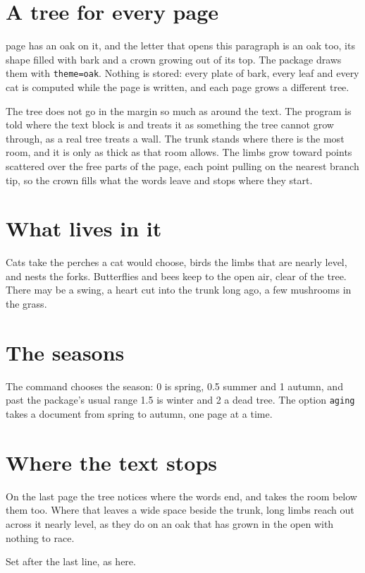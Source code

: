 \documentclass[11pt,a4paper]{article}
\newcommand\code[1]{\texttt{\small #1}}
\begin{document}
\section{A tree for every page}

 page has an oak on it, and the letter that opens this paragraph
is an oak too, its shape filled with bark and a crown growing out of its top. The package draws
them with \code{theme=oak}. Nothing is stored: every plate of bark, every leaf and every cat is
computed while the page is written, and each page grows a different tree.

The tree does not go in the margin so much as around the text. The program is told where the
text block is and treats it as something the tree cannot grow through, as a real tree treats a
wall. The trunk stands where there is the most room, and it is only as thick as that room
allows. The limbs grow toward points scattered over the free parts of the page, each point
pulling on the nearest branch tip, so the crown fills what the words leave and stops where
they start.

\section{What lives in it}

Cats take the perches a cat would choose, birds the limbs that are nearly level, and nests the
forks. Butterflies and bees keep to the open air, clear of the tree. There may be a swing, a
heart cut into the trunk long ago, a few mushrooms in the grass.

\section{The seasons}

The command \code{\string\florilegiumage} chooses the season: 0 is spring, 0.5 summer and 1
autumn, and past the package's usual range 1.5 is winter and 2 a dead tree. The option
\code{aging} takes a document from spring to autumn, one page at a time.

\newpage
\section{Where the text stops}

On the last page the tree notices where the words end, and takes the room below them too.
Where that leaves a wide space beside the trunk, long limbs reach out across it nearly level,
as they do on an oak that has grown in the open with nothing to race.

Set \code{\string\florilegiumtextend} after the last line, as here.
\florilegiumtextend
\end{document}
